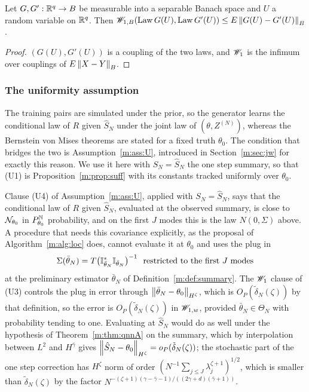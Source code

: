 \begin{lemma}\label{m:lem:coupling}
Let $G,G':\mathbb{R}^q\to B$ be measurable into a separable Banach space and $U$ a random variable on $\mathbb{R}^q$. Then $\mathscr{W}_{1,B}(\operatorname{Law} G(U),\operatorname{Law} G'(U))\le E\left\|G(U)-G'(U)\right\|_B$.
\end{lemma}

\begin{proof}
$(G(U),G'(U))$ is a coupling of the two laws, and $\mathscr{W}_1$ is the infimum over couplings of $E\left\|X-Y\right\|_B$.
\end{proof}

\subsubsection{The uniformity assumption} The training pairs are simulated under the prior, so the generator learns the conditional law of $R$ given $\hat S_N$ under the joint law of $(\theta,Z^{(N)})$, whereas the Bernstein von Mises theorems are stated for a fixed truth $\theta_0$. The condition that bridges the two is Assumption~\ref{m:ass:U}, introduced in Section~\ref{m:sec:jw} for exactly this reason. We use it here with $S_N=\hat S_N$ the one step summary, so that (U1) is Proposition~\ref{m:prop:suff} with its constants tracked uniformly over $\theta_0$.

Clause (U4) of Assumption~\ref{m:ass:U}, applied with $S_N=\hat S_N$, says that the conditional law of $R$ given $\hat S_N$, evaluated at the observed summary, is close to $\mathcal{N}_{\theta_0}$ in $P^{\mathbb{N}}_{\theta_0}$ probability, and on the first $J$ modes this is the law $N(0,\Sigma)$ above. A procedure that needs this covariance explicitly, as the proposal of Algorithm~\ref{m:alg:loc} does, cannot evaluate it at $\theta_0$ and uses the plug in
\[
\Sigma(\bar\theta_N)=T\big(\I^*_{\bar\theta_N}\I_{\bar\theta_N}\big)^{-1}\ \ \text{restricted to the first $J$ modes}
\]
at the preliminary estimator $\bar\theta_N$ of Definition~\ref{m:def:summary}. The $\mathscr{W}_1$ clause of (U3) controls the plug in error through $\left\|\bar\theta_N-\theta_0\right\|_{H^\zeta}$, which is $O_P(\tilde\delta_N(\zeta))$ by that definition, so the error is $O_P(\tilde\delta_N(\zeta))$ in $\mathscr{W}_{1,w}$, provided $\bar\theta_N\in\Theta_N$ with probability tending to one. Evaluating at $\hat S_N$ would do as well under the hypothesis of Theorem~\ref{m:thm:qnnA} on the summary, which by interpolation between $L^2$ and $H^{\bar\gamma}$ gives $\left\|\hat S_N-\theta_0\right\|_{H^\zeta}=o_P(\tilde\delta_N(\zeta))$; the stochastic part of the one step correction has $H^\zeta$ norm of order $(N^{-1}\sum_{j\le J}\lambda_j^{\zeta+1})^{1/2}$, which is smaller than $\tilde\delta_N(\zeta)$ by the factor $N^{-(\zeta+1)(\gamma-\bar\gamma-1)/((2\gamma+d)(\bar\gamma+1))}$.
